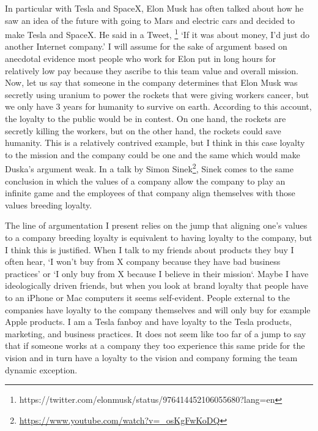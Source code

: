 \documentclass[12pt]{article}
\begin{document}
In particular with Tesla and SpaceX, Elon Musk has often talked about how he saw
an idea of the future with going to Mars and electric cars and decided to make
Tesla and SpaceX. He said in a Tweet,
\footnote{https://twitter.com/elonmusk/status/976414452106055680?lang=en} `If it
was about money, I’d just do another Internet company.' I will assume for the
sake of argument based on anecdotal evidence most people who work for Elon put
in long hours for relatively low pay because they ascribe to this team value and
overall mission. Now, let us say that someone in the company determines that
Elon Musk was secretly using uranium to power the rockets that were giving
workers cancer, but we only have 3 years for humanity to survive on earth.
According to this account, the loyalty to the public would be in contest. On one
hand, the rockets are secretly killing the workers, but on the other hand, the
rockets could save humanity. This is a relatively contrived example, but I think
in this case loyalty to the mission and the company could be one and the same
which would make Duska's argument weak. In a talk by Simon
Sinek\footnote{\url{https://www.youtube.com/watch?v=_osKgFwKoDQ}}, Sinek comes
to the same conclusion in which the values of a company allow the company to
play an infinite game and the employees of that company align themselves with
those values breeding loyalty.

The line of argumentation I present relies on the jump that aligning one's
values to a company breeding loyalty is equivalent to having loyalty to the
company, but I think this is justified. When I talk to my friends about products
they buy I often hear, `I won't buy from X company because they have bad
business practices' or `I only buy from X because I believe in their mission`.
Maybe I have ideologically driven friends, but when you look at brand loyalty
that people have to an iPhone or Mac computers it seems self-evident. People
external to the companies have loyalty to the company themselves and will only
buy for example Apple products. I am a Tesla fanboy and have loyalty to the
Tesla products, marketing, and business practices. It does not seem like too far
of a jump to say that if someone works at a company they too experience this
same pride for the vision and in turn have a loyalty to the vision and company
forming the team dynamic exception.
\end{document}
